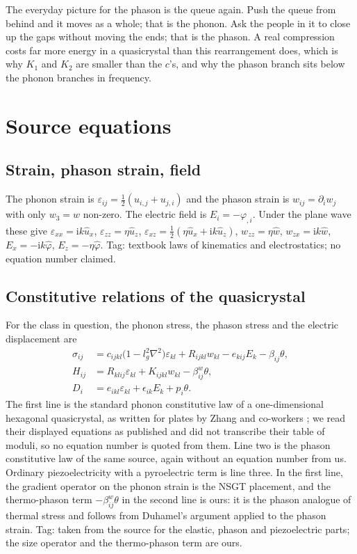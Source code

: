 \documentclass[11pt,a4paper]{article}
\newcommand{\eps}{\varepsilon}
\newcommand{\ii}{\mathrm{i}}
\newcommand{\bx}{\hat u_x}
\newcommand{\bz}{\hat u_z}
\newcommand{\bw}{\hat w}
\newcommand{\bp}{\hat\varphi}
\newcommand{\bwth}{\beta^{w}}
\begin{document}
The everyday picture for the phason is the queue again. Push the queue from behind and it moves as a whole;
that is the phonon. Ask the people in it to close up the gaps without moving the ends; that is the phason.
A real compression costs far more energy in a quasicrystal than this rearrangement does, which is why
$K_1$ and $K_2$ are smaller than the $c$'s, and why the phason branch sits below the phonon branches in
frequency.

\section{Source equations}\label{sec:src}

\subsection{Strain, phason strain, field}

The phonon strain is $\eps_{ij}=\tfrac12(u_{i,j}+u_{j,i})$ and the phason strain is
$w_{ij}=\partial_iw_j$ with only $w_3=w$ non-zero. The electric field is $E_i=-\varphi_{,i}$. Under the plane
wave these give $\eps_{xx}=\ii k\bx$, $\eps_{zz}=\eta\bz$, $\eps_{xz}=\tfrac12(\eta\bx+\ii k\bz)$,
$w_{zz}=\eta\bw$, $w_{zx}=\ii k\bw$, $E_x=-\ii k\bp$, $E_z=-\eta\bp$.
Tag: textbook laws of kinematics and electrostatics; no equation number claimed.

\subsection{Constitutive relations of the quasicrystal}

For the class in question, the phonon stress, the phason stress and the electric displacement are
\begin{equation}\label{eq:const}
\begin{aligned}
\sigma_{ij}&=c_{ijkl}\bigl(1-l_g^2\nabla^2\bigr)\eps_{kl}+R_{ijkl}w_{kl}-e_{kij}E_k-\beta_{ij}\theta,\\
H_{ij}&=R_{klij}\eps_{kl}+K_{ijkl}w_{kl}-\bwth_{ij}\theta,\\
D_i&=e_{ikl}\eps_{kl}+\epsilon_{ik}E_k+p_i\theta .
\end{aligned}
\end{equation}
The first line is the standard phonon constitutive law of a one-dimensional hexagonal quasicrystal, as
written for plates by Zhang and co-workers \cite{Zhang2021}; we read their displayed equations as published
and did not transcribe their table of moduli, so no equation number is quoted from them. Line two is
the phason constitutive law of the same source, again without an equation number from us. Ordinary
piezoelectricity with a pyroelectric term is line three. In the first line, the gradient operator on the
phonon strain is the NSGT placement, and the thermo-phason term $-\bwth_{ij}\theta$ in the second line is ours: it is the phason
analogue of thermal stress and follows from Duhamel's argument applied to the phason strain.
Tag: taken from the source for the elastic, phason and piezoelectric parts; the size operator and the
thermo-phason term are ours.
\end{document}
